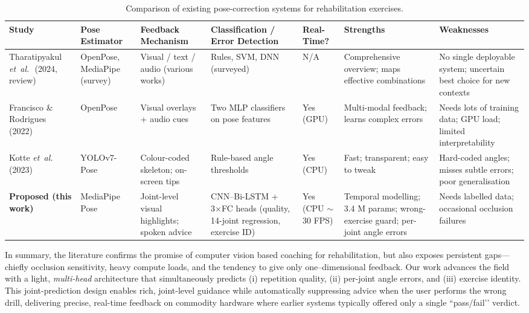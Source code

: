 \documentclass{article}
\begin{document}
\begin{table}[t]
  \caption{Comparison of existing pose-correction systems for rehabilitation exercises.}
  \label{tab:comparison}
  \centering\small            %
  \setlength{\tabcolsep}{3pt} %
  \renewcommand{\arraystretch}{1.15}
  \begin{tabular}{|p{2.8cm}|p{2cm}|p{2.4cm}|p{2.4cm}|p{1.2cm}|p{2.6cm}|p{2.6cm}|}
    \hline
    \textbf{Study} &
    \textbf{Pose Estimator} &
    \textbf{Feedback Mechanism} &
    \textbf{Classification / Error Detection} &
    \textbf{Real-Time?} &
    \textbf{Strengths} &
    \textbf{Weaknesses} \\ \hline
    
    Tharatipyakul \textit{et~al.}~\cite{Tharatipyakul2024Review}\,(2024, review) &
    OpenPose, MediaPipe (survey) &
    Visual / text / audio (various works) &
    Rules, SVM, DNN (surveyed) &
    N/A &
    Comprehensive overview; maps effective combinations &
    No single deployable system; uncertain best choice for new contexts \\ \hline
    
    Francisco \& Rodrigues~\cite{Francisco2022}\,(2022) &
    OpenPose &
    Visual overlays + audio cues &
    Two MLP classifiers on pose features &
    Yes (GPU) &
    Multi-modal feedback; learns complex errors &
    Needs lots of training data; GPU load; limited interpretability \\ \hline
    
    Kotte \textit{et~al.}~\cite{Kotte2023}\,(2023) &
    YOLOv7-Pose &
    Colour-coded skeleton; on-screen tips &
    Rule-based angle thresholds &
    Yes (CPU) &
    Fast; transparent; easy to tweak &
    Hard-coded angles; misses subtle errors; poor generalisation \\ \hline
    
    \textbf{Proposed (this work)} &
    MediaPipe Pose &
    Joint-level visual highlights; spoken advice &
    CNN–Bi-LSTM  + 3×FC heads (quality, 14-joint regression, exercise ID) &
    Yes (CPU $\sim$30 FPS) &
    Temporal modelling; 3.4 M params; wrong-exercise guard; per-joint angle errors &
    Needs labelled data; occasional occlusion failures \\ \hline
  \end{tabular}
\end{table}


In summary, the literature confirms the promise of computer vision based coaching for rehabilitation, but also exposes persistent gaps—chiefly occlusion sensitivity, heavy compute loads, and the tendency to give only one–dimensional feedback. Our work advances the field with a light, \emph{multi-head} architecture that simultaneously predicts (i) repetition quality, (ii) per-joint angle errors, and (iii) exercise identity. This joint-prediction design enables rich, joint-level guidance while automatically suppressing advice when the user performs the wrong drill, delivering precise, real-time feedback on commodity hardware where earlier systems typically offered only a single “pass/fail’’ verdict.
\end{document}
